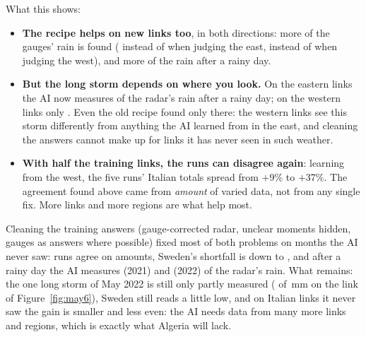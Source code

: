 What this shows:
\begin{itemize}
\item \textbf{The recipe helps on new links too}, in both directions: more of the gauges' rain is found
(\NlFinWestGauges{} instead of \NlRelWestGauges{} when judging the east, \NlFinEastGauges{} instead of
\NlRelEastGauges{} when judging the west), and more of the rain after a rainy day.
\item \textbf{But the long storm depends on where you look.} On the eastern links the AI now measures \NlFinWestLong{}
of the radar's rain after a rainy day; on the western links only \NlFinEastLong{}. Even the old recipe
found only \NlRelEastLong{} there: the western links see this storm differently from anything the AI learned from in
the east, and cleaning the answers cannot make up for links it has never seen in such weather.
\item \textbf{With half the training links, the runs can disagree again}: learning from the west, the five runs' Italian
totals spread from $+$9\% to $+$37\%. The agreement found
above came from \emph{amount} of varied data, not from any single fix. More links and more regions are what help most.
\end{itemize}

\begin{oneline}
Cleaning the training answers (gauge-corrected radar, unclear moments hidden, gauges as answers where possible) fixed most
of both problems on months the AI never saw: runs agree on amounts, Sweden's shortfall is down to
\CVfinSeBias, and after a rainy day the AI measures \CVfinLongAd{} (2021) and \CVfinLongBd{} (2022) of the radar's rain.
What remains: the one long storm of May 2022 is still only partly measured (\Mayaifin{} of \Maygauge\,mm on the
link of Figure~\ref{fig:may6}), Sweden still reads a little low, and on Italian links it never saw the gain is smaller and
less even: the AI needs data from many more links and regions, which is exactly what Algeria will lack.
\end{oneline}
